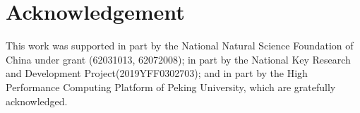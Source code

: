 \documentclass[manuscript,screen]{acmart}
\begin{document}
\section*{Acknowledgement}
This work was supported in part by the National Natural Science Foundation of China under grant (62031013, 62072008); in part by the National Key Research and Development Project(2019YFF0302703); and in part by the High Performance Computing Platform of Peking University, which are gratefully acknowledged.




\end{document}
